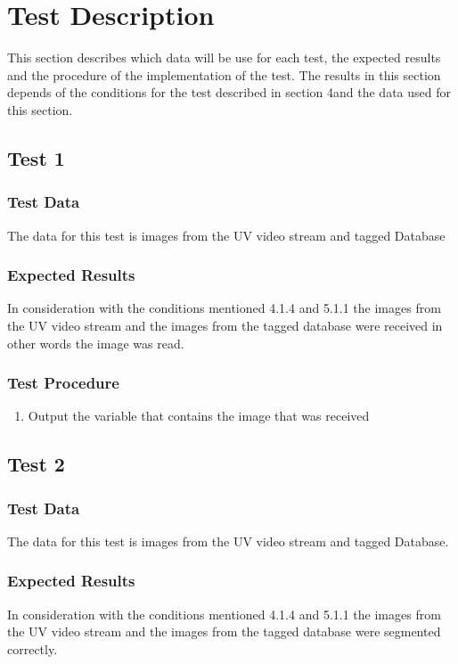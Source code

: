 \documentclass[12pt]{article}
\begin{document}
\section{Test Description}

This section describes which data will be use for each test, the expected results and the procedure of the implementation of the test. The results in this section depends of the conditions for the test described in section 4and the data used for this section.

\subsection{Test 1}
\subsubsection{Test Data}
The data for this test is images from the UV video stream and tagged Database

\subsubsection{Expected Results}
In consideration with the conditions mentioned 4.1.4 and 5.1.1 the images from the UV video stream and the images from the tagged database were received in other words the image was read.

\subsubsection{Test Procedure}
 \begin{enumerate}
  \item Output the variable that contains the image that was received
  \end{enumerate}

\subsection{Test 2}
\subsubsection{Test Data}
The data for this test is images from the UV video stream and tagged Database.

\subsubsection{Expected Results}
In consideration with the conditions mentioned 4.1.4 and 5.1.1 the images from the UV video stream and the images from the tagged database were segmented correctly.
\end{document}
